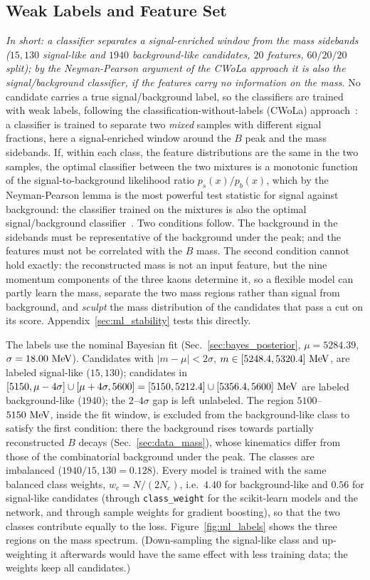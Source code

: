 \subsection{Weak Labels and Feature Set}
\label{sec:ml_labels}
\emph{In short: a classifier separates a signal-enriched window from the mass sidebands ($15{,}130$ signal-like and $1940$ background-like candidates, $20$ features, $60/20/20$ split); by the Neyman-Pearson argument of the CWoLa approach it is also the signal/background classifier, if the features carry no information on the mass.}
No candidate carries a true signal/background label, so the classifiers are trained with weak labels, following the classification-without-labels (CWoLa) approach~\cite{cwola}: a classifier is trained to separate two \emph{mixed} samples with different signal fractions, here a signal-enriched window around the $B$ peak and the mass sidebands. If, within each class, the feature distributions are the same in the two samples, the optimal classifier between the two mixtures is a monotonic function of the signal-to-background likelihood ratio $p_s(x)/p_b(x)$, which by the Neyman-Pearson lemma is the most powerful test statistic for signal against background: the classifier trained on the mixtures is also the optimal signal/background classifier~\cite{cwola}. Two conditions follow. The background in the sidebands must be representative of the background under the peak; and the features must not be correlated with the $B$ mass. The second condition cannot hold exactly: the reconstructed mass is not an input feature, but the nine momentum components of the three kaons determine it, so a flexible model can partly learn the mass, separate the two mass regions rather than signal from background, and \emph{sculpt} the mass distribution of the candidates that pass a cut on its score. Appendix~\ref{sec:ml_stability} tests this directly.

The labels use the nominal Bayesian fit (Sec.~\ref{sec:bayes_posterior}, $\mu=5284.39$, $\sigma=18.00\,\,\text{Me\hspace{-.08em}V}$). Candidates with $|m-\mu|<2\sigma$, $m\in[5248.4,5320.4]\,\,\text{Me\hspace{-.08em}V}$, are labeled signal-like ($15{,}130$); candidates in $[5150,\mu-4\sigma]\cup[\mu+4\sigma,5600]=[5150,5212.4]\cup[5356.4,5600]\,\,\text{Me\hspace{-.08em}V}$ are labeled background-like ($1940$); the $2$--$4\sigma$ gap is left unlabeled. The region $5100$--$5150\,\,\text{Me\hspace{-.08em}V}$, inside the fit window, is excluded from the background-like class to satisfy the first condition: there the background rises towards partially reconstructed $B$ decays (Sec.~\ref{sec:data_mass}), whose kinematics differ from those of the combinatorial background under the peak. The classes are imbalanced ($1940/15{,}130=0.128$). Every model is trained with the same balanced class weights, $w_c=N/(2N_c)$, i.e.\ $4.40$ for background-like and $0.56$ for signal-like candidates (through \texttt{class\_weight} for the scikit-learn models and the network, and through sample weights for gradient boosting), so that the two classes contribute equally to the loss. Figure~\ref{fig:ml_labels} shows the three regions on the mass spectrum. (Down-sampling the signal-like class and up-weighting it afterwards would have the same effect with less training data; the weights keep all candidates.)

